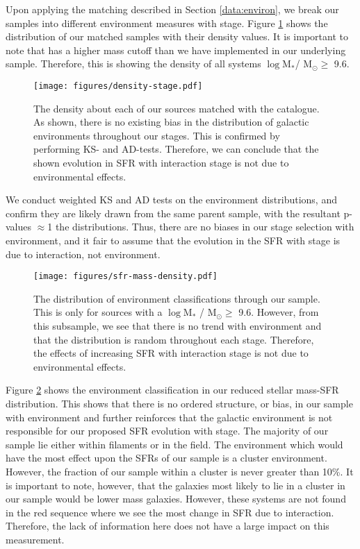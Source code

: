 \documentclass[fleqn,usenatbib]{mnras}
\begin{document}
Upon applying the matching described in Section \ref{data:environ}, we break our samples into different environment measures with stage. Figure \ref{fig:dens-stage} shows the distribution of our matched samples with their density values. It is important to note that \citet{2017ApJ...837...16D} has a higher mass cutoff than we have implemented in our underlying sample. Therefore, this is showing the density of all systems $\log$M$_*$/ M$_\odot \geq$ 9.6. 

\begin{figure}
    \centering
    \texttt{[image: figures/density-stage.pdf]}
    \caption{The density about each of our sources matched with the \citet{2017ApJ...837...16D} catalogue. As shown, there is no existing bias in the distribution of galactic environments throughout our stages. This is confirmed by performing KS- and AD-tests. Therefore, we can conclude that the shown evolution in SFR with interaction stage is not due to environmental effects.}
    \label{fig:dens-stage}
\end{figure}

We conduct weighted KS and AD tests on the environment distributions, and confirm they are likely drawn from the same parent sample, with the resultant p-values $\approx$1 the distributions. Thus, there are no biases in our stage selection with environment, and it fair to assume that the evolution in the SFR with stage is due to interaction, not environment.

\begin{figure}
    \centering
    \texttt{[image: figures/sfr-mass-density.pdf]}
    \caption{The distribution of environment classifications through our sample. This is only for sources with a $\log$M$_*$ / M$_\odot \geq$ 9.6. However, from this subsample, we see that there is no trend with environment and that the distribution is random throughout each stage. Therefore, the effects of increasing SFR with interaction stage is not due to environmental effects.}
    \label{fig:dens-sfr-mass}
\end{figure}

Figure \ref{fig:dens-sfr-mass} shows the environment classification in our reduced stellar mass-SFR distribution. This shows that there is no ordered structure, or bias, in our sample with environment and further reinforces that the galactic environment is not responsible for our proposed SFR evolution with stage. The majority of our sample lie either within filaments or in the field. The environment which would have the most effect upon the SFRs of our sample is a cluster environment. However, the fraction of our sample within a cluster is never greater than 10\%. It is important to note, however, that the galaxies most likely to lie in a cluster in our sample would be lower mass galaxies. However, these systems are not found in the red sequence where we see the most change in SFR due to interaction. Therefore, the lack of information here does not have a large impact on this measurement. 
\end{document}
